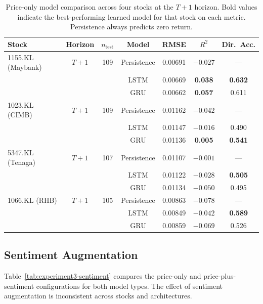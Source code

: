 \documentclass[12pt]{ucetd}
\begin{document}
\begin{table}[H]
\caption{Price-only model comparison across four stocks at the $T{+}1$ horizon. Bold values indicate the best-performing learned model for that stock on each metric. Persistence always predicts zero return.}
\label{tab:experiment3-price-only}
\centering
\small
\begin{tabular}{|l|c|c|c|c|c|c|}
\hline
\textbf{Stock} & \textbf{Horizon} & \textbf{$n_{\text{test}}$} & \textbf{Model} & \textbf{RMSE} & \textbf{$R^2$} & \textbf{Dir.\ Acc.} \\
\hline
1155.KL (Maybank) & $T{+}1$ & 109 & Persistence & 0.00691 & $-0.027$ & --- \\
                   &         &     & LSTM        & 0.00669 & \textbf{0.038} & \textbf{0.632} \\
                   &         &     & GRU         & 0.00662 & \textbf{0.057} & 0.611 \\
\hline
1023.KL (CIMB)    & $T{+}1$ & 109 & Persistence & 0.01162 & $-0.042$ & --- \\
                   &         &     & LSTM        & 0.01147 & $-0.016$ & 0.490 \\
                   &         &     & GRU         & 0.01136 & \textbf{0.005} & \textbf{0.541} \\
\hline
5347.KL (Tenaga)  & $T{+}1$ & 107 & Persistence & 0.01107 & $-0.001$ & --- \\
                   &         &     & LSTM        & 0.01122 & $-0.028$ & \textbf{0.505} \\
                   &         &     & GRU         & 0.01134 & $-0.050$ & 0.495 \\
\hline
1066.KL (RHB)     & $T{+}1$ & 105 & Persistence & 0.00863 & $-0.078$ & --- \\
                   &         &     & LSTM        & 0.00849 & $-0.042$ & \textbf{0.589} \\
                   &         &     & GRU         & 0.00859 & $-0.069$ & 0.526 \\
\hline
\end{tabular}
\end{table}

\subsection{Sentiment Augmentation}

Table~\ref{tab:experiment3-sentiment} compares the price-only and price-plus-sentiment configurations for both model types. The effect of sentiment augmentation is inconsistent across stocks and architectures.
\end{document}
